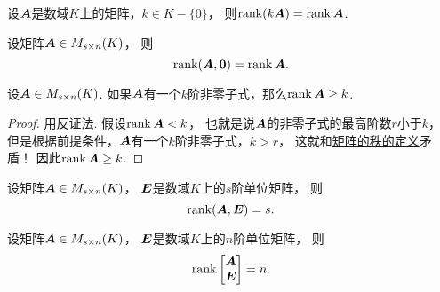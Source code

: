 \begin{property}\label{theorem:线性方程组.矩阵的秩的性质3}
设\(\boldsymbol{A}\)是数域\(K\)上的矩阵，\(k \in K-\{0\}\)，
则\(\rank(k\boldsymbol{A}) = \rank\boldsymbol{A}\).
\end{property}

\begin{property}
设矩阵\(\boldsymbol{A} \in M_{s \times n}(K)\)，
则\begin{equation*}
	\rank(\boldsymbol{A},\boldsymbol0) = \rank\boldsymbol{A}.
\end{equation*}
\end{property}

\begin{theorem}
设\(\boldsymbol{A}\in M_{s \times n}(K)\).
如果\(\boldsymbol{A}\)有一个\(k\)阶非零子式，那么\(\rank\boldsymbol{A}\geq k\).
\begin{proof}
用反证法.
假设\(\rank\boldsymbol{A}<k\)，
也就是说\(\boldsymbol{A}\)的非零子式的最高阶数\(r\)小于\(k\)，
但是根据前提条件，\(\boldsymbol{A}\)有一个\(k\)阶非零子式，\(k>r\)，
这就和\hyperref[definition:线性方程组.矩阵的秩的定义]{矩阵的秩的定义}矛盾！
因此\(\rank\boldsymbol{A}\geq k\).
\end{proof}
\end{theorem}
\begin{corollary}
设矩阵\(\boldsymbol{A} \in M_{s \times n}(K)\)，
\(\boldsymbol{E}\)是数域\(K\)上的\(s\)阶单位矩阵，
则\begin{equation*}
	\rank(\boldsymbol{A},\boldsymbol{E}) = s.
\end{equation*}
\end{corollary}
\begin{corollary}
设矩阵\(\boldsymbol{A} \in M_{s \times n}(K)\)，
\(\boldsymbol{E}\)是数域\(K\)上的\(n\)阶单位矩阵，
则\begin{equation*}
	\rank\begin{bmatrix}
		\boldsymbol{A} \\ \boldsymbol{E}
	\end{bmatrix}
	= n.
\end{equation*}
\end{corollary}

